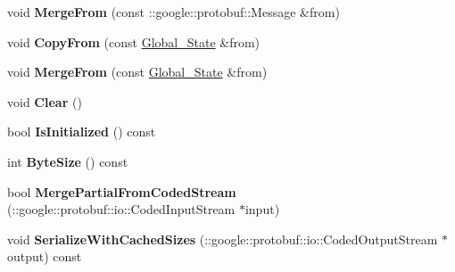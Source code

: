 \begin{DoxyCompactItemize}
\item 
void {\bfseries Merge\+From} (const \+::google\+::protobuf\+::\+Message \&from)\hypertarget{classvss__state_1_1Global__State_ad2905d67a08d3e766963be4d20438dee}{}\label{classvss__state_1_1Global__State_ad2905d67a08d3e766963be4d20438dee}

\item 
void {\bfseries Copy\+From} (const \hyperlink{classvss__state_1_1Global__State}{Global\+\_\+\+State} \&from)\hypertarget{classvss__state_1_1Global__State_aba34386a742582208d2ead2116512710}{}\label{classvss__state_1_1Global__State_aba34386a742582208d2ead2116512710}

\item 
void {\bfseries Merge\+From} (const \hyperlink{classvss__state_1_1Global__State}{Global\+\_\+\+State} \&from)\hypertarget{classvss__state_1_1Global__State_a429e2ccd5b142708a51a3bd069455f52}{}\label{classvss__state_1_1Global__State_a429e2ccd5b142708a51a3bd069455f52}

\item 
void {\bfseries Clear} ()\hypertarget{classvss__state_1_1Global__State_a9c2d7a9cf4dd3c01b53a749e25b0d0fb}{}\label{classvss__state_1_1Global__State_a9c2d7a9cf4dd3c01b53a749e25b0d0fb}

\item 
bool {\bfseries Is\+Initialized} () const \hypertarget{classvss__state_1_1Global__State_ab2c7e2d4af0cd33383e9a4bd1a83113f}{}\label{classvss__state_1_1Global__State_ab2c7e2d4af0cd33383e9a4bd1a83113f}

\item 
int {\bfseries Byte\+Size} () const \hypertarget{classvss__state_1_1Global__State_a10790a0ee8bcc6cff1f704ad0dce113c}{}\label{classvss__state_1_1Global__State_a10790a0ee8bcc6cff1f704ad0dce113c}

\item 
bool {\bfseries Merge\+Partial\+From\+Coded\+Stream} (\+::google\+::protobuf\+::io\+::\+Coded\+Input\+Stream $\ast$input)\hypertarget{classvss__state_1_1Global__State_a6441ee848d925dd1cd3bca5e30c28c7f}{}\label{classvss__state_1_1Global__State_a6441ee848d925dd1cd3bca5e30c28c7f}

\item 
void {\bfseries Serialize\+With\+Cached\+Sizes} (\+::google\+::protobuf\+::io\+::\+Coded\+Output\+Stream $\ast$output) const \hypertarget{classvss__state_1_1Global__State_a01a832c00539c849c8171ff3a228f0df}{}\label{classvss__state_1_1Global__State_a01a832c00539c849c8171ff3a228f0df}


\end{DoxyCompactItemize}
